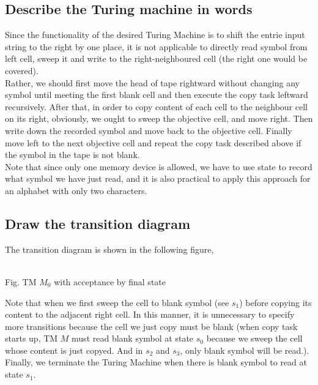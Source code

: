 \documentclass[11pt,a4paper]{article}
\newcommand{\htab}{\hspace*{0.63cm}}
\begin{document}
\subsection{Describe the Turing machine in words}
\htab Since the functionality of the desired Turing Machine is to shift the entrie input string to the right by one place, it is not applicable to directly read symbol from left cell, sweep it and write to the right-neighboured cell (the right one would be covered).\\
\htab Rather, we should first move the head of tape rightward without changing any symbol until meeting the first blank cell and then execute the copy task leftward recursively. After that, in order to copy content of each cell to the neighbour cell on its right, obviously, we ought to sweep the objective cell, and move right. Then write down the recorded symbol and move back to the objective cell. Finally move left to the next objective cell and repeat the copy task described above if the symbol in the tape is not blank. \\
\htab Note that since only one memory device is allowed, we have to use state to record what symbol we have just read, and it is also practical to apply this approach for an alphabet with only two characters.
\subsection{Draw the transition diagram}
\htab The transition diagram is shown in the following figure, 
\begin{center}
\\[0.5cm]
\footnotesize Fig. TM $M_{0}$ with acceptance by final state
\end{center}
\htab Note that when we first sweep the cell to blank symbol (see $s_{1}$) before copying its content to the adjacent right cell. In this manner, it is unnecessary to specify more transitions because the cell we just copy must be blank (when copy task starts up, TM $M$ must read blank symbol at state $s_{0}$ because we sweep the cell whose content is just copyed. And in $s_{2}$ and $s_{3}$, only blank symbol will be read.). Finally, we terminate the Turing Machine when there is blank symbol to read at state $s_{1}$.
\newpage
\end{document}
